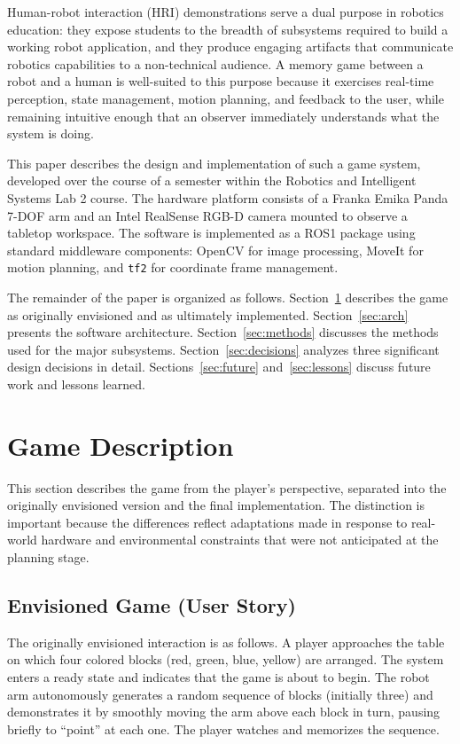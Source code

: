 \documentclass[conference]{IEEEtran}
\begin{document}
Human-robot interaction (HRI) demonstrations serve a dual purpose in
robotics education: they expose students to the breadth of subsystems
required to build a working robot application, and they produce engaging
artifacts that communicate robotics capabilities to a non-technical
audience. A memory game between a robot and a human is well-suited to
this purpose because it exercises real-time perception, state
management, motion planning, and feedback to the user, while remaining
intuitive enough that an observer immediately understands what the
system is doing.

This paper describes the design and implementation of such a game
system, developed over the course of a semester within the Robotics
and Intelligent Systems Lab 2 course. The hardware platform consists
of a Franka Emika Panda 7-DOF arm and an Intel RealSense RGB-D camera
mounted to observe a tabletop workspace. The software is implemented
as a ROS1 package using standard middleware components: OpenCV for
image processing, MoveIt for motion planning, and \texttt{tf2} for
coordinate frame management.

The remainder of the paper is organized as follows. Section~\ref{sec:game}
describes the game as originally envisioned and as ultimately implemented.
Section~\ref{sec:arch} presents the software architecture. Section~\ref{sec:methods}
discusses the methods used for the major subsystems. Section~\ref{sec:decisions}
analyzes three significant design decisions in detail. Sections~\ref{sec:future}
and~\ref{sec:lessons} discuss future work and lessons learned.

\section{Game Description}
\label{sec:game}

This section describes the game from the player's perspective, separated
into the originally envisioned version and the final implementation. The
distinction is important because the differences reflect adaptations
made in response to real-world hardware and environmental constraints
that were not anticipated at the planning stage.

\subsection{Envisioned Game (User Story)}

The originally envisioned interaction is as follows. A player approaches
the table on which four colored blocks (red, green, blue, yellow) are
arranged. The system enters a ready state and indicates that the game
is about to begin. The robot arm autonomously generates a random sequence
of blocks (initially three) and demonstrates it by smoothly moving the
arm above each block in turn, pausing briefly to ``point'' at each one.
The player watches and memorizes the sequence.
\end{document}
